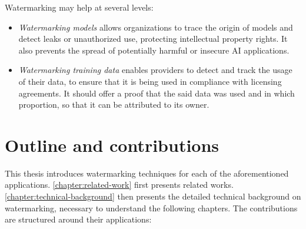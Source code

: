 Watermarking may help at several levels:
\begin{itemize}
    \item \emph{Watermarking models} allows organizations to trace the origin of models and detect leaks or unauthorized use, protecting intellectual property rights. 
    It also prevents the spread of potentially harmful or insecure AI applications.
    \item \emph{Watermarking training data} enables providers to detect and track the usage of their data, to ensure that it is being used in compliance with licensing agreements.
    It should offer a proof that the said data was used and in which proportion, so that it can be attributed to its owner.
\end{itemize}





















\section{Outline and contributions}

This thesis introduces watermarking techniques for each of the aforementioned applications.
\autoref{chapter:related-work} first presents related works.
\autoref{chapter:technical-background} then presents the detailed technical background on watermarking, necessary to understand the following chapters.
The contributions are structured around their applications:

\noindent
{} 

